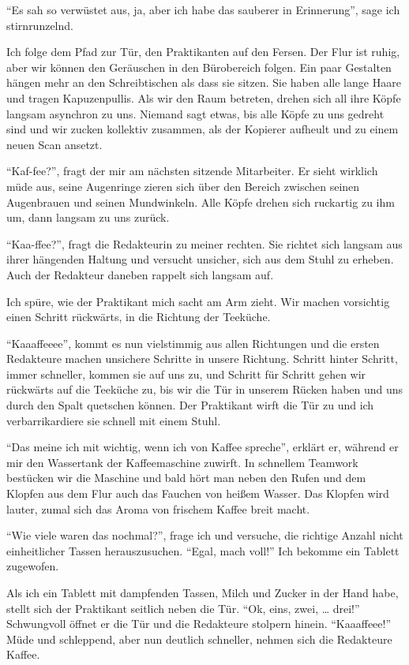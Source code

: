 \documentclass[final]{multiversum}
\begin{document}
\enquote{Es sah so verwüstet aus, ja, aber ich habe das sauberer in Erinnerung}, sage ich stirnrunzelnd.

Ich folge dem Pfad zur Tür, den Praktikanten auf den Fersen.
Der Flur ist ruhig, aber wir können den Geräuschen in den Bürobereich folgen.
Ein paar Gestalten hängen mehr an den Schreibtischen als dass sie sitzen.
Sie haben alle lange Haare und tragen Kapuzenpullis.
Als wir den Raum betreten, drehen sich all ihre Köpfe langsam asynchron zu uns.
Niemand sagt etwas, bis alle Köpfe zu uns gedreht sind und wir zucken kollektiv zusammen, als der Kopierer aufheult und zu einem neuen Scan ansetzt.

\enquote{Kaf-fee?}, fragt der mir am nächsten sitzende Mitarbeiter.
Er sieht wirklich müde aus, seine Augenringe zieren sich über den Bereich zwischen seinen Augenbrauen und seinen Mundwinkeln.
Alle Köpfe drehen sich ruckartig zu ihm um, dann langsam zu uns zurück.

\enquote{Kaa-ffee?}, fragt die Redakteurin zu meiner rechten.
Sie richtet sich langsam aus ihrer hängenden Haltung und versucht unsicher, sich aus dem Stuhl zu erheben.
Auch der Redakteur daneben rappelt sich langsam auf.

Ich spüre, wie der Praktikant mich sacht am Arm zieht.
Wir machen vorsichtig einen Schritt rückwärts, in die Richtung der Teeküche.

\enquote{Kaaaffeeee}, kommt es nun vielstimmig aus allen Richtungen und die ersten Redakteure machen unsichere Schritte in unsere Richtung.
Schritt hinter Schritt, immer schneller, kommen sie auf uns zu, und Schritt für Schritt gehen wir rückwärts auf die Teeküche zu, bis wir die Tür in unserem Rücken haben und uns durch den Spalt quetschen können.
Der Praktikant wirft die Tür zu und ich verbarrikardiere sie schnell mit einem Stuhl.

\enquote{Das meine ich mit wichtig, wenn ich von Kaffee spreche}, erklärt er, während er mir den Wassertank der Kaffeemaschine zuwirft.
In schnellem Teamwork bestücken wir die Maschine und bald hört man neben den Rufen und dem Klopfen aus dem Flur auch das Fauchen von heißem Wasser.
Das Klopfen wird lauter, zumal sich das Aroma von frischem Kaffee breit macht.

\enquote{Wie viele waren das nochmal?}, frage ich und versuche, die richtige Anzahl nicht einheitlicher Tassen herauszusuchen.
\enquote{Egal, mach voll!}
Ich bekomme ein Tablett zugewofen.

Als ich ein Tablett mit dampfenden Tassen, Milch und Zucker in der Hand habe, stellt sich der Praktikant seitlich neben die Tür.
\enquote{Ok, eins, zwei, \dots{} drei!}
Schwungvoll öffnet er die Tür und die Redakteure stolpern hinein.
\enquote{Kaaaffeee!}
Müde und schleppend, aber nun deutlich schneller, nehmen sich die Redakteure Kaffee.
\end{document}
